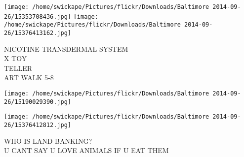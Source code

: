 \documentclass[10pt,letterpaper]{article}
\begin{document}
\texttt{[image: /home/swickape/Pictures/flickr/Downloads/Baltimore 2014-09-26/15353708436.jpg]}
\texttt{[image: /home/swickape/Pictures/flickr/Downloads/Baltimore 2014-09-26/15376413162.jpg]}

NICOTINE TRANSDERMAL SYSTEM\\
X TOY\\
TELLER\\
ART WALK 5{-}8
\pagebreak

\texttt{[image: /home/swickape/Pictures/flickr/Downloads/Baltimore 2014-09-26/15190029390.jpg]}

\vspace{0.25in}
\texttt{[image: /home/swickape/Pictures/flickr/Downloads/Baltimore 2014-09-26/15376412812.jpg]}

WHO IS LAND BANKING?\\
U CANT SAY U LOVE ANIMALS IF U EAT THEM
\pagebreak
\end{document}
